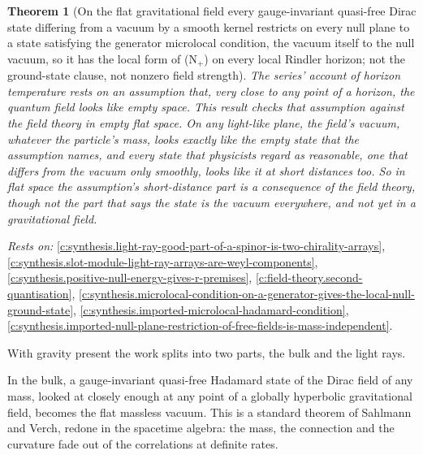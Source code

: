 \documentclass[11pt]{article}
\newtheorem{theorem}{Theorem}[section]
\theoremstyle{definition}
\theoremstyle{plain}
\begin{document}
\begin{theorem}[On the flat gravitational field every gauge-invariant quasi-free Dirac state differing from a vacuum by a smooth kernel restricts on every null plane to a state satisfying the generator microlocal condition, the vacuum itself to the null vacuum, so it has the local form of (N$_{+}$) on every local Rindler horizon; not the ground-state clause, not nonzero field strength]\label{c:synthesis.bulk-hadamard-states-restrict-to-the-generator-condition-on-flat-null-planes}
The series' account of horizon temperature rests on an assumption that, very close to any point of a horizon, the quantum field looks like empty space. This result checks that assumption against the field theory in empty flat space. On any light-like plane, the field's vacuum, whatever the particle's mass, looks exactly like the empty state that the assumption names, and every state that physicists regard as reasonable, one that differs from the vacuum only smoothly, looks like it at short distances too. So in flat space the assumption's short-distance part is a consequence of the field theory, though not the part that says the state is the vacuum everywhere, and not yet in a gravitational field.
\end{theorem}
\noindent\emph{Rests on:} \ref{c:synthesis.light-ray-good-part-of-a-spinor-is-two-chirality-arrays}, \ref{c:synthesis.slot-module-light-ray-arrays-are-weyl-components}, \ref{c:synthesis.positive-null-energy-gives-r-premises}, \ref{c:field-theory.second-quantisation}, \ref{c:synthesis.microlocal-condition-on-a-generator-gives-the-local-null-ground-state}, \ref{c:synthesis.imported-microlocal-hadamard-condition}, \ref{c:synthesis.imported-null-plane-restriction-of-free-fields-is-mass-independent}.

With gravity present the work splits into two parts, the bulk and the light rays.

In the bulk, a gauge-invariant quasi-free Hadamard state of the Dirac field of any mass, looked at closely enough at any point of a globally hyperbolic gravitational field, becomes the flat massless vacuum. This is a standard theorem of Sahlmann and Verch, redone in the spacetime algebra: the mass, the connection and the curvature fade out of the correlations at definite rates.
\end{document}
